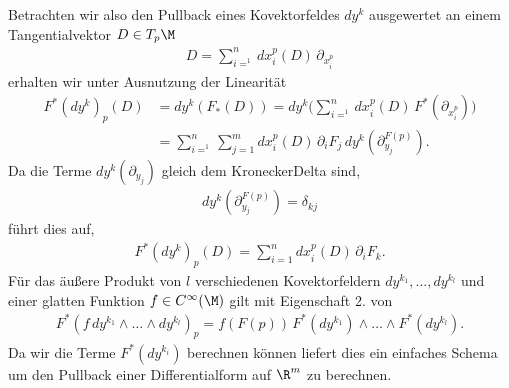 \documentclass[letterpaper,10pt,german]{jupyterBook}
\begin{document}
\sphinxAtStartPar
Betrachten wir also den Pullback eines Kovektorfeldes \(dy^k\) ausgewertet an einem Tangentialvektor \(D\in T_p\M\)
\begin{equation*}
\begin{split}D = \sum_{i=^1}^n dx_i^p(D)\, \partial_{x_i^p}\end{split}
\end{equation*}
\sphinxAtStartPar
erhalten wir unter Ausnutzung der Linearität
\begin{equation*}
\begin{split}F^\ast(dy^k)_{p}(D) &= dy^k(F_\ast(D)) = 
dy^k\big(\sum_{i=^1}^n dx_i^p(D)\, F^\ast(\partial_{x_i^p})\big)\\
&=
\sum_{i=^1}^n \sum_{j=1}^m dx_i^p(D)\,\partial_i F_j\, dy^k(\partial_{y_j}^{F(p)}).\end{split}
\end{equation*}
\sphinxAtStartPar
Da die Terme \(dy^k(\partial_{y_j})\) gleich dem Kronecker\sphinxhyphen{}Delta sind,
\begin{equation*}
\begin{split}dy^k(\partial_{y_j}^{F(p)}) = \delta_{kj}\end{split}
\end{equation*}
\sphinxAtStartPar
führt dies auf,
\begin{equation*}
\begin{split}F^\ast(dy^k)_{p}(D) =
\sum_{i=1}^n dx_i^p(D)\,\partial_i F_k.\end{split}
\end{equation*}
\sphinxAtStartPar
Für das äußere Produkt von \(l\) verschiedenen Kovektorfeldern \(dy^{k_1},\ldots, dy^{k_l}\) und einer glatten Funktion \(f\in C^\infty(\M)\) gilt mit Eigenschaft 2. von {\hyperref[\detokenize{manifolds/diffformen:lem:pullbackprop}]{}}
\begin{equation*}
\begin{split}F^\ast(f\, dy^{k_1}\wedge\ldots\wedge dy^{k_l})_{p} =
f(F(p))\, F^\ast(dy^{k_1})\wedge\ldots\wedge F^\ast(dy^{k_l}).\end{split}
\end{equation*}
\sphinxAtStartPar
Da wir die Terme \(F^\ast(dy^{k_i})\) berechnen können liefert dies ein einfaches Schema um den Pullback einer Differentialform auf \(\R^m\) zu berechnen.
\label{manifolds/diffformen:example-16}
\end{document}
